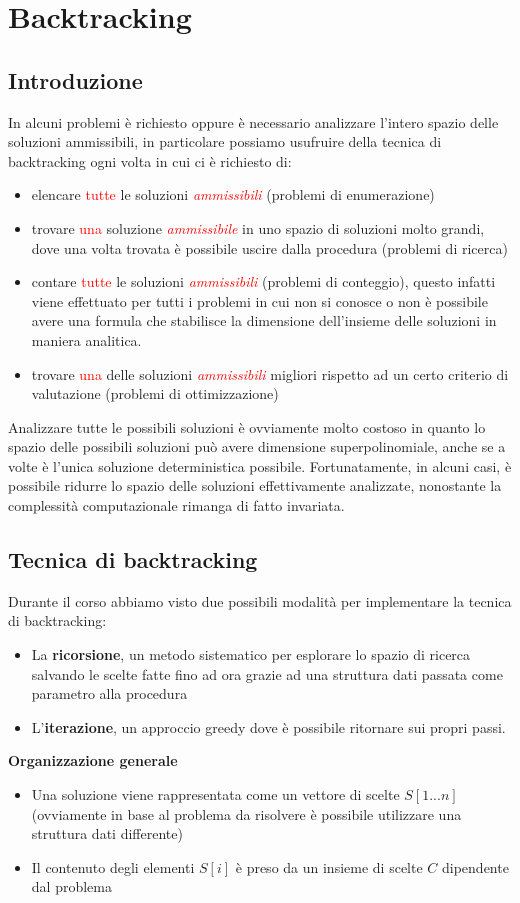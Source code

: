 \documentclass[../cheatSheetAlgoritmi.tex]{subfiles}
\begin{document}
\section{Backtracking}
\subsection{Introduzione}
In alcuni problemi è richiesto oppure è necessario analizzare l'intero spazio delle soluzioni ammissibili, in particolare possiamo usufruire della tecnica di backtracking ogni volta in cui ci è richiesto di:
\begin{itemize}
	\item elencare \textcolor{red}{tutte} le soluzioni \textcolor{red}{\emph{ammissibili}} (problemi di enumerazione)
	\item trovare  \textcolor{red}{una} soluzione \textcolor{red}{\emph{ammissibile}} in uno spazio di soluzioni molto grandi, dove una volta trovata è possibile uscire dalla procedura (problemi di ricerca)
	\item contare  \textcolor{red}{tutte} le soluzioni \textcolor{red}{\emph{ammissibili}} (problemi di conteggio), questo infatti viene effettuato per tutti i problemi in cui non si conosce o non è possibile avere una formula che stabilisce la dimensione dell'insieme delle soluzioni in maniera analitica.
	\item trovare \textcolor{red}{una} delle soluzioni \textcolor{red}{\emph{ammissibili}} migliori rispetto ad un certo criterio di valutazione (problemi di ottimizzazione)
\end{itemize}
Analizzare tutte le possibili soluzioni è ovviamente molto costoso in quanto lo spazio delle possibili soluzioni può avere dimensione superpolinomiale, anche se a volte è l'unica soluzione deterministica possibile. Fortunatamente, in alcuni casi, è possibile ridurre lo spazio delle soluzioni effettivamente analizzate, nonostante la complessità computazionale rimanga di fatto invariata. 
\subsection{Tecnica di backtracking}
Durante il corso abbiamo visto due possibili modalità per implementare la tecnica di backtracking: 
\begin{itemize}
	\item La \textbf{ricorsione}, un metodo sistematico per esplorare lo spazio di ricerca salvando le scelte fatte fino ad ora grazie ad una struttura dati passata come parametro alla procedura
	\item L'\textbf{iterazione}, un approccio greedy dove è possibile ritornare sui propri passi.
\end{itemize}
\textbf{Organizzazione generale} 
\begin{itemize}
	\item Una soluzione viene rappresentata come un vettore di scelte $S[1...n]$ (ovviamente in base al problema da risolvere è possibile utilizzare una struttura dati differente)
	\item Il contenuto degli elementi $S[i]$ è preso da un insieme di scelte $C$ dipendente dal problema
\end{itemize}
\newpage
\end{document}

